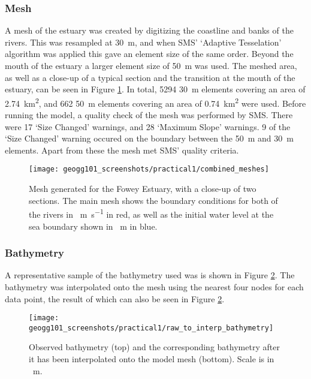 \documentclass{article}
\begin{document}
\subsubsection{Mesh}
A mesh of the estuary was created by digitizing the coastline and banks of the rivers. This was resampled at \SI{30}{m}, and when SMS' `Adaptive Tesselation' algorithm was applied this gave an element size of the same order. Beyond the mouth of the estuary a larger element size of \SI{50}{m} was used. The meshed area, as well as a close-up of a typical section and the transition at the mouth of the estuary, can be seen in Figure \ref{fig:combined_meshes}. In total, 5294 \SI{30}{m} elements covering an area of \SI{2.74}{km^{2}}, and 662 \SI{50}{m} elements covering an area of \SI{0.74}{km^{2}} were used. Before running the model, a quality check of the mesh was performed by SMS. There were 17 `Size Changed' warnings, and 28 `Maximum Slope' warnings. 9 of the `Size Changed' warning occured on the boundary between the \SI{50}{m} and \SI{30}{m} elements. Apart from these the mesh met SMS' quality criteria.


\begin{figure}[hbp]
    \centering
    \texttt{[image: geogg101\_screenshots/practical1/combined\_meshes]}
    \caption{Mesh generated for the Fowey Estuary, with a close-up of two sections. The main mesh shows the boundary conditions for both of the rivers in \SI{}{m.s^{-1}} in red, as well as the initial water level at the sea boundary shown in \SI{}{m} in blue.}
    \label{fig:combined_meshes}
\end{figure}

\subsubsection{Bathymetry}
A representative sample of the bathymetry used was is shown in Figure \ref{fig:raw_to_interp_bathymetry}. The bathymetry was interpolated onto the mesh using the nearest four nodes for each data point, the result of which can also be seen in Figure \ref{fig:raw_to_interp_bathymetry}.

\begin{figure}[hbp]
    \centering
    \texttt{[image: geogg101\_screenshots/practical1/raw\_to\_interp\_bathymetry]}
    \caption{Observed bathymetry (top) and the corresponding bathymetry after it has been interpolated onto the model mesh (bottom). Scale is in \SI{}{m}.}
    \label{fig:raw_to_interp_bathymetry}
\end{figure}
\end{document}

